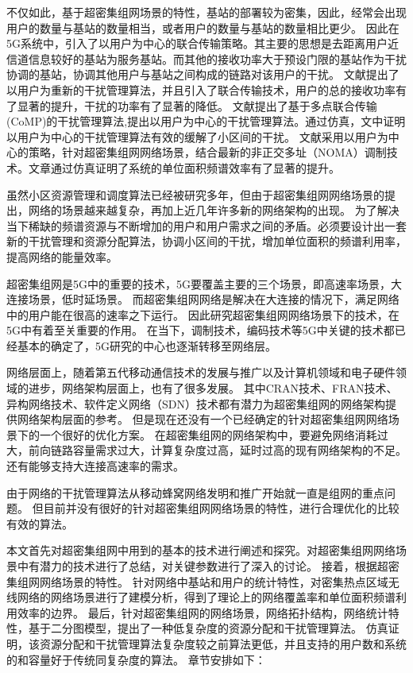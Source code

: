 不仅如此，基于超密集组网场景的特性，基站的部署较为密集，因此，经常会出现用户的数量与基站的数量相当，或者用户的数量与基站的数量相比更少。
因此在5G系统中，引入了以用户为中心的联合传输策略。其主要的思想是去距离用户近信道信息较好的基站为服务基站。而其他的接收功率大于预设门限的基站作为干扰协调的基站，协调其他用户与基站之间构成的链路对该用户的干扰。
文献\cite{Ucent}提出了以用户为重新的干扰管理算法，并且引入了联合传输技术，用户的总的接收功率有了显著的提升，干扰的功率有了显著的降低。
文献\cite{CoMPUDN}提出了基于多点联合传输(CoMP)的干扰管理算法,提出以用户为中心的干扰管理算法。通过仿真，文中证明以用户为中心的干扰管理算法有效的缓解了小区间的干扰。
文献\cite{UNOMAcent}采用以用户为中心的策略，针对超密集组网网络场景，结合最新的非正交多址（NOMA）调制技术。文章通过仿真证明了系统的单位面积频谱效率有了显著的提升。

虽然小区资源管理和调度算法已经被研究多年，但由于超密集组网网络场景的提出，网络的场景越来越复杂，再加上近几年许多新的网络架构的出现。
为了解决当下稀缺的频谱资源与不断增加的用户和用户需求之间的矛盾。必须要设计出一套新的干扰管理和资源分配算法，协调小区间的干扰，增加单位面积的频谱利用率，提高网络的能量效率。


超密集组网是5G中的重要的技术，5G要覆盖主要的三个场景，即高速率场景，大连接场景，低时延场景。
而超密集组网网络是解决在大连接的情况下，满足网络中的用户能在很高的速率之下运行。
因此研究超密集组网网络场景下的技术，在5G中有着至关重要的作用。
在当下，调制技术，编码技术等5G中关键的技术都已经基本的确定了，5G研究的中心也逐渐转移至网络层。

网络层面上，随着第五代移动通信技术的发展与推广以及计算机领域和电子硬件领域的进步，网络架构层面上，也有了很多发展。
其中CRAN技术、FRAN技术、异构网络技术、软件定义网络（SDN）技术都有潜力为超密集组网的网络架构提供网络架构层面的参考。
但是现在还没有一个已经确定的针对超密集组网网络场景下的一个很好的优化方案。
在超密集组网的网络架构中，要避免网络消耗过大，前向链路容量需求过大，计算复杂度过高，延时过高的现有网络架构的不足。
还有能够支持大连接高速率的需求。

由于网络的干扰管理算法从移动蜂窝网络发明和推广开始就一直是组网的重点问题。
但目前并没有很好的针对超密集组网网络场景的特性，进行合理优化的比较有效的算法。



本文首先对超密集组网中用到的基本的技术进行阐述和探究。对超密集组网网络场景中有潜力的技术进行了总结，对关键参数进行了深入的讨论。
接着，根据超密集组网网络场景的特性。
针对网络中基站和用户的统计特性，对密集热点区域无线网络的网络场景进行了建模分析，得到了理论上的网络覆盖率和单位面积频谱利用效率的边界。
最后，针对超密集组网的网络场景，网络拓扑结构，网络统计特性，基于二分图模型，提出了一种低复杂度的资源分配和干扰管理算法。
仿真证明，该资源分配和干扰管理算法复杂度较之前算法更低，并且支持的用户数和系统的和容量好于传统同复杂度的算法。
章节安排如下：

